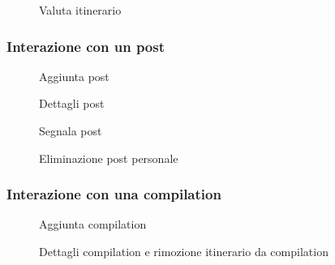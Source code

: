 \documentclass{natourDoc}
\begin{document}
\begin{figure}[!htpb]
	\centering
	
	\caption{Valuta itinerario}
\end{figure}
\FloatBarrier

\newpage

\subsubsection{Interazione con un post}
\begin{figure}[!htpb]
	\centering
	
	\caption{Aggiunta post}
\end{figure}
\FloatBarrier

\begin{figure}[!htpb]
	\centering
	
	\caption{Dettagli post}
\end{figure}
\FloatBarrier

\begin{figure}[!htpb]
	\centering
	
	\caption{Segnala post}
\end{figure}
\FloatBarrier

\begin{figure}[!htpb]
	\centering
	
	\caption{Eliminazione post personale}
\end{figure}
\FloatBarrier

\newpage

\subsubsection{Interazione con una compilation}
\begin{figure}[!htpb]
	\centering
	
	\caption{Aggiunta compilation}
\end{figure}
\FloatBarrier

\begin{figure}[!htpb]
	\centering
	
	\caption{Dettagli compilation e rimozione itinerario da compilation}
\end{figure}
\FloatBarrier
\end{document}
